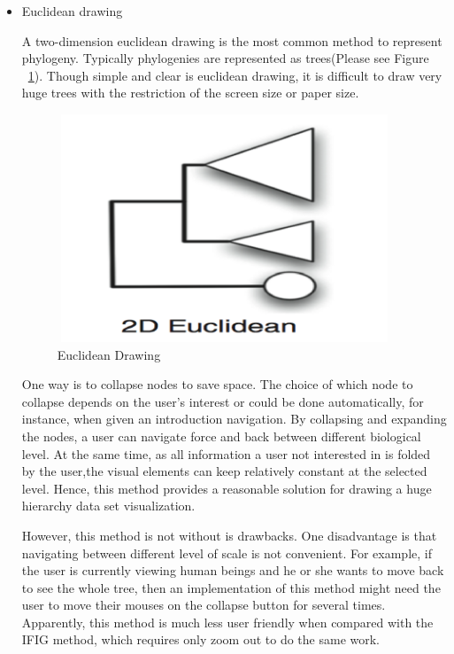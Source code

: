 \documentclass[MSc]{icldt}
\begin{document}
\begin{itemize}
  \item Euclidean drawing
 
 A two-dimension euclidean drawing is the most common method to represent phylogeny. Typically phylogenies are represented as trees(Please see Figure ~\ref{fig:eucdeanDrawing}). Though simple and clear is euclidean drawing, it is difficult to draw very huge trees with the restriction of the screen size or paper size.
  
\begin{figure}[H]
  \centering
  \includegraphics [width=10cm,height=6.8cm]{EuclideanDrawing}
  \caption{Euclidean Drawing}
  \label{fig:eucdeanDrawing}
\end{figure}
  
  One way is to collapse nodes to save space. The choice of which node to collapse depends on the user's interest or could be done automatically, for instance, when given an introduction navigation.\cite{euclidean} By collapsing and expanding the nodes, a user can navigate force and back between different biological level. At the same time, as all information a user not interested in is folded by the user,the visual elements can keep relatively constant at the selected level. Hence, this method provides a reasonable solution for drawing a huge hierarchy data set visualization.
  
However, this method is not without is drawbacks. One disadvantage is that navigating between different level of scale is not convenient. For example, if the user is currently viewing human beings and he or she wants to move back to see the whole tree, then an implementation of this method might need the user to move their mouses on the collapse button for several times. Apparently, this method is much less user friendly when compared with the IFIG method, which requires only zoom out to do the same work.


\end{itemize}
\end{document}
